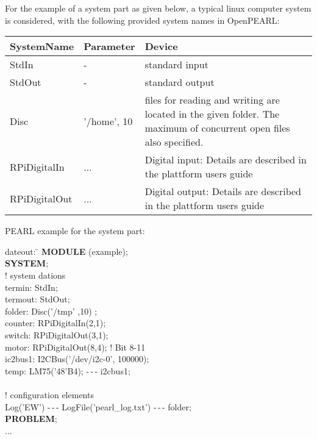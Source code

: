 



For the example of a system part as given below, a typical linux computer
system is considered, with the following provided system names in OpenPEARL:

\begin{tabular}{ll@{\x}p{6cm}}
SystemName & Parameter & Device \\ \hline
StdIn  &  - & standard input \\
StdOut  &  - & standard output \\
Disc       & '/home', 10 & files for reading and writing are located in the given folder. The maximum of concurrent open files also specified. \\
RPiDigitalIn & ... & Digital input: Details are described in 
		the plattform users guide \\
RPiDigitalOut & ... & Digital output: Details are described in 
		the plattform users guide \\
\end{tabular}

PEARL example for the system part:

\begin{tabbing}
\x dateout: \= \kill
{\bf MODULE} (example); \> \\
{\bf SYSTEM}; \> \\
! system dations \\
\x termin:  \> StdIn; \\
\x termout: \> StdOut;\\
\x folder:  \> Disc('/tmp' ,10) ;  \\
\x counter: \> RPiDigitalIn(2,1); \\
\x switch:  \> RPiDigitalOut(3,1); \\
\x motor:   \> RPiDigitalOut(8,4); ! Bit 8-11\\
\x ic2bus1: \> I2CBus('/dev/i2c-0', 100000);\\
\x temp:    \> LM75('48'B4); -\,-\,- i2cbus1;\\
\x\\
! configuration elements \\
\x Log('EW') -\,-\,- LogFile('pearl\_log.txt') -\,-\,- folder; \\
{\bf PROBLEM};\> \\
\x ... \>
\end{tabbing}

